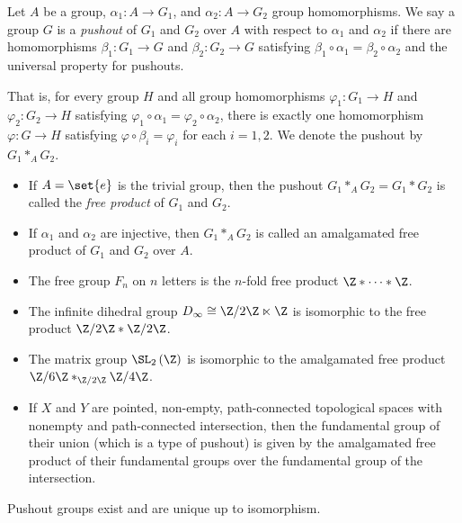 \documentclass[10pt]{mypackage}
\begin{document}
\begin{definition}
  Let $A$ be a group, $\alpha_1\colon A\rightarrow G_1$, and $\alpha_2\colon A\rightarrow G_2$ group homomorphisms. We say a group $G$ is a \textit{pushout} of $G_1$ and $G_2$ over $A$ with respect to $\alpha_1$ and $\alpha_2$ if there are homomorphisms $\beta_1\colon G_1\rightarrow G$ and $\beta_2\colon G_2\rightarrow G$ satisfying $\beta_1\circ \alpha_1 = \beta_2\circ \alpha_2$ and the universal property for pushouts.

  That is, for every group $H$ and all group homomorphisms $\varphi_1\colon G_1\rightarrow H$ and $\varphi_2\colon G_2\rightarrow H$ satisfying $\varphi_1\circ \alpha_1 = \varphi_2\circ \alpha_2$, there is exactly one homomorphism $\varphi\colon G\rightarrow H$ satisfying $\varphi\circ\beta_i = \varphi_i$ for each $i=1,2$. We denote the pushout by $G_1\ast_{A}G_2$.
  \begin{itemize}
    \item If $A = \set{e}$ is the trivial group, then the pushout $G_1\ast_A G_2 = G_1\ast G_2$ is called the \textit{free product} of $G_1$ and $G_2$.
    \item If $\alpha_1$ and $\alpha_2$ are injective, then $G_1\ast_{A}G_2$ is called an amalgamated free product of $G_1$ and $G_2$ over $A$.
  \end{itemize}
\end{definition}
\begin{example}\hfill
  \begin{itemize}
    \item The free group $F_n$ on $n$ letters is the $n$-fold free product $\Z\ast\cdots\ast\Z$.
    \item The infinite dihedral group $D_{\infty}\cong \Z/2\Z\ltimes \Z$ is isomorphic to the free product $\Z/2\Z\ast \Z/2\Z$.
    \item The matrix group $\SL_2\left(\Z\right)$ is isomorphic to the amalgamated free product $\Z/6\Z\ast_{\Z/2\Z}\Z/4\Z$.
    \item If $X$ and $Y$ are pointed, non-empty, path-connected topological spaces with nonempty and path-connected intersection, then the fundamental group of their union (which is a type of pushout) is given by the amalgamated free product of their fundamental groups over the fundamental group of the intersection.
  \end{itemize}
\end{example}
\begin{theorem}
  Pushout groups exist and are unique up to isomorphism.
\end{theorem}
\end{document}
